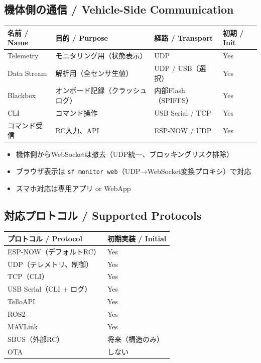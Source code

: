 \documentclass[a4paper,11pt]{article}
\newcommand{\thead}[1]{\textbf{\color{accentdark}#1}}
\begin{document}
\subsection{機体側の通信 / Vehicle-Side Communication}

\begin{table}[h]
\centering
\begin{tabular}{@{}llll@{}}
\toprule
\thead{名前 / Name} & \thead{目的 / Purpose} & \thead{経路 / Transport} & \thead{初期 / Init} \\
\midrule
Telemetry & モニタリング用（状態表示） & UDP & Yes \\
Data Stream & 解析用（全センサ生値） & UDP / USB（選択） & Yes \\
Blackbox & オンボード記録（クラッシュログ） & 内部Flash（SPIFFS） & Yes \\
CLI & コマンド操作 & USB Serial / TCP & Yes \\
コマンド受信 & RC入力、API & ESP-NOW / UDP & Yes \\
\bottomrule
\end{tabular}
\end{table}

\begin{itemize}[leftmargin=*, itemsep=2pt]
    \item 機体側からWebSocketは撤去（UDP統一、ブロッキングリスク排除）
    \item ブラウザ表示は \texttt{sf monitor web}（UDP→WebSocket変換プロキシ）で対応
    \item スマホ対応は専用アプリ or WebApp
\end{itemize}

\subsection{対応プロトコル / Supported Protocols}

\begin{table}[h]
\centering
\begin{tabular}{@{}ll@{}}
\toprule
\thead{プロトコル / Protocol} & \thead{初期実装 / Initial} \\
\midrule
ESP-NOW（デフォルトRC） & Yes \\
UDP（テレメトリ、制御） & Yes \\
TCP（CLI） & Yes \\
USB Serial（CLI + ログ） & Yes \\
TelloAPI & Yes \\
ROS2 & Yes \\
MAVLink & Yes \\
SBUS（外部RC） & 将来（構造のみ） \\
OTA & しない \\
\bottomrule
\end{tabular}
\end{table}
\end{document}
